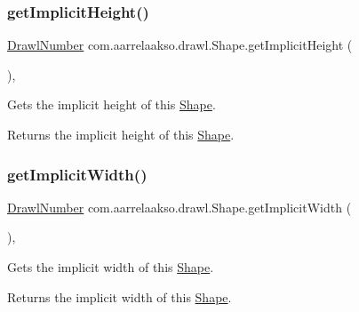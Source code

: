 \subsubsection{\texorpdfstring{get\+Implicit\+Height()}{getImplicitHeight()}}
{\footnotesize\ttfamily \hyperlink{classcom_1_1aarrelaakso_1_1drawl_1_1_drawl_number}{Drawl\+Number} com.\+aarrelaakso.\+drawl.\+Shape.\+get\+Implicit\+Height (\begin{DoxyParamCaption}{ }\end{DoxyParamCaption})\hspace{0.3cm}{\ttfamily [protected]}, {\ttfamily [inherited]}}



Gets the implicit height of this \hyperlink{classcom_1_1aarrelaakso_1_1drawl_1_1_shape}{Shape}. 

\begin{DoxyReturn}{Returns}
the implicit height of this \hyperlink{classcom_1_1aarrelaakso_1_1drawl_1_1_shape}{Shape}. 
\end{DoxyReturn}
\mbox{\label{classcom_1_1aarrelaakso_1_1drawl_1_1_shape_af7ebce58a8dbba0cbe372040b74d7fca}} 
\subsubsection{\texorpdfstring{get\+Implicit\+Width()}{getImplicitWidth()}}
{\footnotesize\ttfamily \hyperlink{classcom_1_1aarrelaakso_1_1drawl_1_1_drawl_number}{Drawl\+Number} com.\+aarrelaakso.\+drawl.\+Shape.\+get\+Implicit\+Width (\begin{DoxyParamCaption}{ }\end{DoxyParamCaption})\hspace{0.3cm}{\ttfamily [protected]}, {\ttfamily [inherited]}}



Gets the implicit width of this \hyperlink{classcom_1_1aarrelaakso_1_1drawl_1_1_shape}{Shape}. 

\begin{DoxyReturn}{Returns}
the implicit width of this \hyperlink{classcom_1_1aarrelaakso_1_1drawl_1_1_shape}{Shape}. 
\end{DoxyReturn}
\mbox{\label{classcom_1_1aarrelaakso_1_1drawl_1_1_shape_ae1820c7d674c6c022b72cc086005131f}} 
